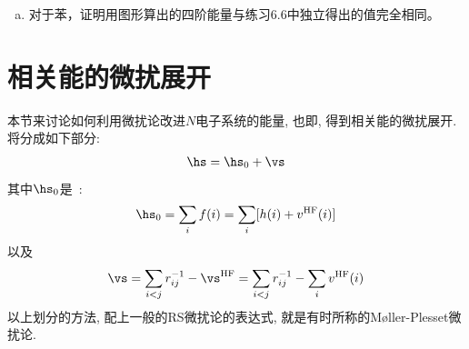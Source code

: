 {\begin{enumerate}[a.]
\begin{equation*}
\begin{tikzpicture}[baseline={(current bounding box.center)}, postaction={on each segment={mid arrow}},scale=.6]
			arc (-45:15:2.12cm)node[right,midway]{r} node{\dian} arc(-15:-45:2.12cm)node[left,midway]{b} node{\dian} arc(225:180:2.57cm)node[right,midway]{s} node{\dian} to [bend right] node[left,midway]{s} (8,-7.);
		\end{tikzpicture}
		=
		\begin{tikzpicture}[baseline={(current bounding box.center)}, postaction={on each segment={mid arrow}},scale=.6]
		\path [draw=blue,postaction={on each segment={mid reverse arrow}}]
		(10,-7.) node{\dian}
		arc (-45:15:2.12cm)node[right,midway]{r} node{\dian} arc(-15:-45:2.12cm)node[left,midway]{b} node{\dian} arc(225:180:2.57cm)node[right,midway]{s} node{\dian} to [bend right] node[left,midway]{s} (10,-7.);
		\draw (12,-5.5)node{$n=4$};
		\end{tikzpicture}
		=-\frac{3N\beta}{128}
		\end{equation*}
		继而有
		\begin{equation*}
		E_0^{(4)} = \frac{N\beta}{64}
		\end{equation*}
		因此环多烯（$N>6$）的共振能算到第四阶就是$(1/4+1/64)N\beta=0.2656 N\beta$, 和渐近的精确值$0.2732\beta$相比非常接近（占97\%）。
	\item 对于苯，证明用图形算出的四阶能量与练习6.6中独立得出的值完全相同。
\end{enumerate}
}


\section{相关能的微扰展开}
本节来讨论如何利用微扰论改进$N$电子系统的\hft 能量, 
也即, 
得到相关能的微扰展开. 
将\ha 分成如下部分:
\begin{align}
\hs=\hs_0+\vs
\end{align} 
其中$\hs_0$是\hft\ \ha:
\begin{align}
\hs_0=\sum_{i} f(i) = \sum_{i}[h(i)+v^\mathrm{HF}(i)]
\end{align}
以及
\begin{align}
\vs = \sum_{i<j}r_{ij}^{-1} - \vs^\mathrm{HF} =  \sum_{i<j}r_{ij}^{-1} - \sum_{i}v^\mathrm{HF}(i)
\end{align}
以上划分\ha 的方法, 
配上一般的RS微扰论的表达式, 
就是有时所称的{M{\o}ller-Plesset}微扰论.


